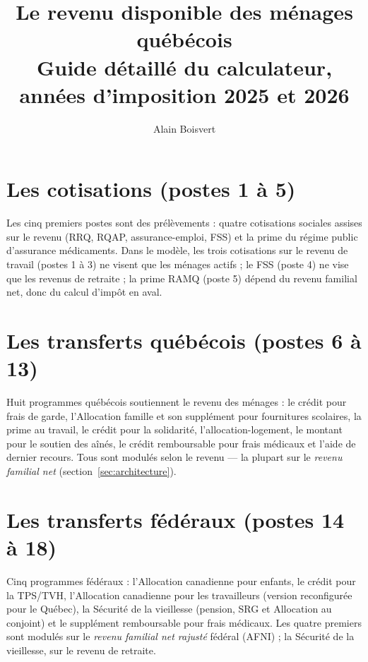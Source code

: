 \documentclass[]{fairmeta}
\title{Le revenu disponible des ménages québécois\\
\Large Guide détaillé du calculateur, années d'imposition 2025 et 2026}
\author[1]{Alain Boisvert}
\affiliation[1]{Université Laval}
\begin{document}
\maketitle

\tableofcontents
\newpage






\section{Les cotisations (postes 1 à 5)}
\label{sec:cotisations}
Les cinq premiers postes sont des prélèvements : quatre cotisations sociales
assises sur le revenu (RRQ, RQAP, assurance-emploi, FSS) et la prime du régime
public d'assurance médicaments. Dans le modèle, les trois cotisations sur le
revenu de travail (postes 1 à 3) ne visent que les ménages actifs ; le FSS
(poste 4) ne vise que les revenus de retraite ; la prime RAMQ (poste 5)
dépend du revenu familial net, donc du calcul d'impôt en aval.







\section{Les transferts québécois (postes 6 à 13)}
\label{sec:transferts-qc}
Huit programmes québécois soutiennent le revenu des ménages : le crédit pour
frais de garde, l'Allocation famille et son supplément pour fournitures
scolaires, la prime au travail, le crédit pour la solidarité,
l'allocation-logement, le montant pour le soutien des aînés, le crédit
remboursable pour frais médicaux et l'aide de dernier recours. Tous sont
modulés selon le revenu --- la plupart sur le \emph{revenu familial net}
(section~\ref{sec:architecture}).










\section{Les transferts fédéraux (postes 14 à 18)}
\label{sec:transferts-fed}
Cinq programmes fédéraux : l'Allocation canadienne pour enfants, le crédit
pour la TPS/TVH, l'Allocation canadienne pour les travailleurs (version
reconfigurée pour le Québec), la Sécurité de la vieillesse (pension, SRG et
Allocation au conjoint) et le supplément remboursable pour frais médicaux.
Les quatre premiers sont modulés sur le \emph{revenu familial net rajusté}
fédéral (AFNI) ; la Sécurité de la vieillesse, sur le revenu de retraite.
\end{document}
